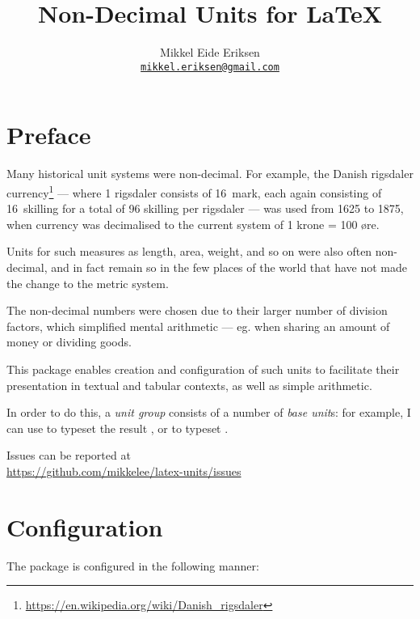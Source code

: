 \documentclass[
	a4paper,
]{article}
\title{Non-Decimal Units for \LaTeX}
\author{Mikkel Eide Eriksen\\\href{mailto:mikkel.eriksen@gmail.com}{\texttt{mikkel.eriksen@gmail.com}}}
\begin{document}
\maketitle

\section{Preface} %

Many historical unit systems were non-decimal. For example, the Danish rigsdaler currency\footnote{\url{https://en.wikipedia.org/wiki/Danish_rigsdaler}} --- where 1 rigsdaler consists of 16~mark, each again consisting of 16~skilling for a total of 96 skilling per rigsdaler --- was used from 1625 to 1875, when currency was decimalised to the current system of 1 krone = 100 øre.


Units for such measures as length, area, weight, and so on were also often non-decimal, and in fact remain so in the few places of the world that have not made the change to the metric system.

The non-decimal numbers were chosen due to their larger number of division factors, which simplified mental arithmetic --- eg. when sharing an amount of money or dividing goods.

This package enables creation and configuration of such units to facilitate their presentation in textual and tabular contexts, as well as simple arithmetic.

In order to do this, a \emph{unit group} consists of a number of \emph{base unit}s: for example, I can use  to typeset the result , or  to typeset .

Issues can be reported at\\\null\hfill\url{https://github.com/mikkelee/latex-units/issues}

\clearpage
\section{Configuration} %

The package is configured in the following manner:
\end{document}
